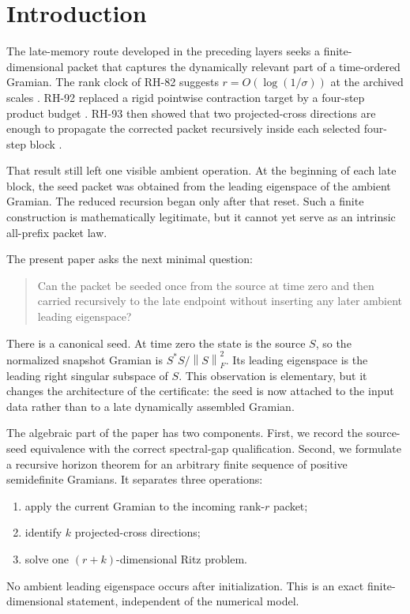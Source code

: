 \documentclass[11pt]{article}
\theoremstyle{definition}
\theoremstyle{remark}
\newcommand{\norm}[1]{\left\lVert#1\right\rVert}
\begin{document}
\section{Introduction}

The late-memory route developed in the preceding layers seeks a
finite-dimensional packet that captures the dynamically relevant part of a
time-ordered Gramian.  The rank clock of RH-82 suggests
$r=O(\log(1/\sigma))$ at the archived scales \citep{WangRankClock2026}.
RH-92 replaced a rigid pointwise contraction target by a four-step product
budget \citep{WangBlockBudget2026}.  RH-93 then showed that two
projected-cross directions are enough to propagate the corrected packet
recursively inside each selected four-step block
\citep{WangRecursiveRitz2026}.

That result still left one visible ambient operation.  At the beginning of
each late block, the seed packet was obtained from the leading eigenspace of
the ambient Gramian.  The reduced recursion began only after that reset.  Such
a finite construction is mathematically legitimate, but it cannot yet serve
as an intrinsic all-prefix packet law.

The present paper asks the next minimal question:
\begin{quote}
Can the packet be seeded once from the source at time zero and then carried
recursively to the late endpoint without inserting any later ambient leading
eigenspace?
\end{quote}
There is a canonical seed.  At time zero the state is the source $S$, so the
normalized snapshot Gramian is $S^*S/\norm S_F^2$.  Its leading eigenspace is
the leading right singular subspace of $S$.  This observation is elementary,
but it changes the architecture of the certificate: the seed is now attached
to the input data rather than to a late dynamically assembled Gramian.

The algebraic part of the paper has two components.  First, we record the
source-seed equivalence with the correct spectral-gap qualification.  Second,
we formulate a recursive horizon theorem for an arbitrary finite sequence of
positive semidefinite Gramians.  It separates three operations:
\begin{enumerate}[leftmargin=2em]
\item apply the current Gramian to the incoming rank-$r$ packet;
\item identify $k$ projected-cross directions;
\item solve one $(r+k)$-dimensional Ritz problem.
\end{enumerate}
No ambient leading eigenspace occurs after initialization.  This is an exact
finite-dimensional statement, independent of the numerical model.
\end{document}
